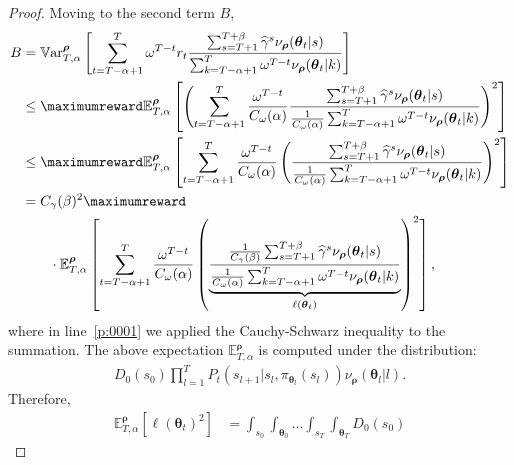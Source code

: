 \begin{proof}
Moving to the second term $B$,
\begin{align}
    B 
    & = \mathbb{V}\mathrm{ar}^{\boldsymbol\rho}_{T,\alpha} \left[
        \sum_{t=T-\alpha+1}^{T} \omega^{T-t}  r_t  \frac{\sum_{s=T+1}^{T+\beta} \widehat{\gamma}^s\nu_{\boldsymbol\rho}(\boldsymbol\theta_t\vert s)}{\sum_{k=T-\alpha+1}^T \omega^{T-t}\nu_{\boldsymbol\rho}(\boldsymbol\theta_t \vert k)} 
    \right]\notag \\
    & \le \maximumreward  \mathbb{E}^{\boldsymbol\rho}_{T,\alpha} \left[\left(
        \sum_{t=T-\alpha+1}^{T} \frac{\omega^{T-t}}{C_\omega(\alpha)} \frac{\sum_{s=T+1}^{T+\beta} \widehat{\gamma}^s\nu_{\boldsymbol\rho}(\boldsymbol\theta_t\vert s)}{\frac{1}{C_\omega(\alpha)}\sum_{k=T-\alpha+1}^T \omega^{T-t}\nu_{\boldsymbol\rho}(\boldsymbol\theta_t \vert k)}\right)^2 
    \right] \nonumber\\
    & \le \maximumreward  \mathbb{E}^{\boldsymbol\rho}_{T,\alpha} \left[
        \sum_{t=T-\alpha+1}^{T} \frac{\omega^{T-t}}{C_\omega(\alpha)} \left( \frac{\sum_{s=T+1}^{T+\beta} \widehat{\gamma}^s\nu_{\boldsymbol\rho}(\boldsymbol\theta_t\vert s)}{\frac{1}{C_\omega(\alpha)} \sum_{k=T-\alpha+1}^T \omega^{T-t}\nu_{\boldsymbol\rho}(\boldsymbol\theta_t \vert k)}\right)^2 
    \right] \label{p:0001} \\
    & = C_\gamma(\beta)^2 \maximumreward \nonumber
    \\
    &\qquad\cdot \mathbb{E}^{\boldsymbol\rho}_{T,\alpha} \left[
        \sum_{t=T-\alpha+1}^{T} \frac{\omega^{T-t}}{C_\omega(\alpha)} \left( \underbrace{\frac{\frac{1}{C_\gamma(\beta)} \sum_{s=T+1}^{T+\beta} \widehat{\gamma}^s\nu_{\boldsymbol\rho}(\boldsymbol\theta_t\vert s)}{\frac{1}{C_\omega(\alpha)} \sum_{k=T-\alpha+1}^T \omega^{T-t}\nu_{\boldsymbol\rho}(\boldsymbol\theta_t \vert k)}}_{\ell(\boldsymbol\theta_t)}\right)^2 \nonumber
    \right],
\end{align}
where in line~\eqref{p:0001} we applied the Cauchy-Schwarz inequality to the summation. 
The above expectation $\mathbb{E}^{\boldsymbol\rho}_{T,\alpha}$ is computed under the distribution:
\begin{align*}
    D_0(s_0) \prod_{l=1}^{T} P_t(s_{l+1}\vert s_l, \pi_{\boldsymbol\theta_l}(s_l)) \nu_{\boldsymbol\rho}(\boldsymbol\theta_l\vert l).
\end{align*}
Therefore, 
\begin{align*}
   \mathbb{E}^{\boldsymbol\rho}_{T,\alpha} \left[\ell(\boldsymbol\theta_t)^2 \right] &= \int_{s_0}\int_{\boldsymbol\theta_0} \dots \int_{s_T} \int_{\boldsymbol\theta_T}  D_0(s_0) 

\end{align*}
\end{proof}
